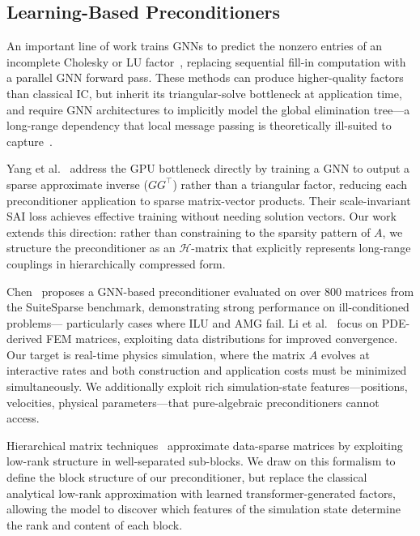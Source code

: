 \documentclass[acmtog,anonymous,review]{acmart}
\begin{document}
\subsection{Learning-Based Preconditioners}
\label{sec:related:precond}

An important line of work trains GNNs to predict the nonzero entries of an incomplete Cholesky or
LU factor~\cite{li2023learning,hausner2023neural,trifonov2024linear}, replacing sequential fill-in
computation with a parallel GNN forward pass.  These methods can produce higher-quality factors
than classical IC, but inherit its triangular-solve bottleneck at application time, and require
GNN architectures to implicitly model the global elimination tree---a long-range dependency that
local message passing is theoretically ill-suited to
capture~\cite{trifonov2025gnn}.

Yang et al.~\cite{yang2025sparse} address the GPU bottleneck directly by training a GNN to output
a sparse approximate inverse ($GG^\top$) rather than a triangular factor, reducing each
preconditioner application to sparse matrix-vector products.  Their scale-invariant SAI loss
achieves effective training without needing solution vectors.  Our work extends this direction:
rather than constraining to the sparsity pattern of $A$, we structure the preconditioner as an
$\mathcal{H}$-matrix that explicitly represents long-range couplings in hierarchically compressed
form.

Chen~\cite{chen2024gnp} proposes a GNN-based preconditioner evaluated on over 800 matrices from
the SuiteSparse benchmark, demonstrating strong performance on ill-conditioned problems---
particularly cases where ILU and AMG fail.  Li et al.~\cite{li2023learning} focus on PDE-derived
FEM matrices, exploiting data distributions for improved convergence.  Our target is real-time
physics simulation, where the matrix $A$ evolves at interactive rates and both construction and
application costs must be minimized simultaneously.  We additionally exploit rich simulation-state
features---positions, velocities, physical parameters---that pure-algebraic preconditioners cannot
access.

Hierarchical matrix techniques~\cite{hackbusch1999sparse,hackbusch2002adaptive} approximate
data-sparse matrices by exploiting low-rank structure in well-separated sub-blocks.  We draw on
this formalism to define the block structure of our preconditioner, but replace the classical
analytical low-rank approximation with learned transformer-generated factors, allowing the model
to discover which features of the simulation state determine the rank and content of each block.
\end{document}
